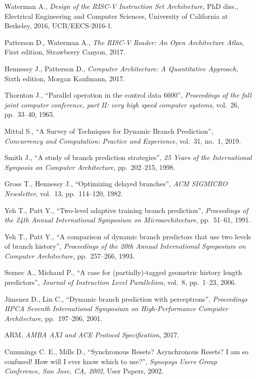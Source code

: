 \begin{thebibliography}{99}
\setlength{\parskip}{0.5\baselineskip}

    Waterman A., 
    \textit{Design of the RISC-V Instruction Set Architecture},
    PhD diss.,
    Electrical Engineering and Computer Sciences,
    University of California at Berkeley,
    2016,
    UCB/EECS-2016-1.

    Patterson D., Waterman A., 
    \textit{The RISC-V Reader: An Open Architecture Atlas},
    First edition,
    Strawberry Canyon,
    2017.

    Hennessy J., Patterson D., 
    \textit{Computer Architecture: A Quantitative Approach},
    Sixth edition,
    Morgan Kaufmann,
    2017.

    Thornton J.,
    ``Parallel operation in the control data 6600'',  
    \textit{Proceedings of the fall joint computer conference, part II: very high speed computer systems},
    vol.~26, pp.~33--40, 
    1965.

    Mittal S.,
    ``A Survey of Techniques for Dynamic Branch Prediction'',  
    \textit{Concurrency and Computation: Practice and Experience},
    vol.~31, no.~1, 
    2019.

    Smith J.,
    ``A study of branch prediction strategies'',  
    \textit{25 Years of the International Symposia on Computer Architecture},
    pp.~202--215, 
    1998.

    Gross T., Hennessy J.,
    ``Optimizing delayed branches'',  
    \textit{ACM SIGMICRO Newsletter},
    vol.~13, pp.~114--120, 
    1982.
    
    Yeh T., Patt Y.,
    ``Two-level adaptive training branch prediction'',  
    \textit{Proceedings of the 24th Annual International Symposium on Microarchitecture},
    pp.~51--61, 
    1991.

    Yeh T., Patt Y.,
    ``A comparison of dynamic branch predictors that use two levels of branch history'',  
    \textit{Proceedings of the 20th Annual International
    Symposium on Computer Architecture},
    pp.~257--266, 
    1993.

    Seznec A., Michaud P.,
    ``A case for (partially)-tagged geometric history length predictors'',  
    \textit{Journal of Instruction Level Parallelism},
    vol.~8, pp.~1--23, 
    2006.

    Jimenez D., Lin C.,
    ``Dynamic branch prediction with perceptrons'',  
    \textit{Proceedings HPCA Seventh International Symposium on High-Performance Computer Architecture},
    pp.~197--206, 
    2001.

    ARM, 
    \textit{AMBA AXI and ACE Protocol Specification},
    2017.

    Cummings C. E., Mills D.,
    ``Synchronous Resets? Asynchronous Resets? I am so confused! How will I ever know which to use?'',  
    \textit{Synopsys Users Group Conference, San Jose, CA, 2002},
    User Papers, 
    2002.

\end{thebibliography}